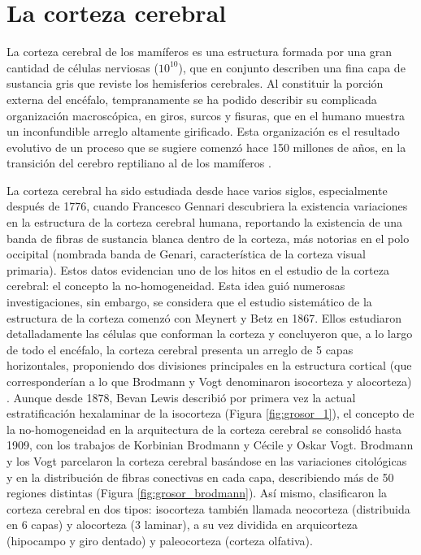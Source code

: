
\section{La corteza cerebral}
La corteza cerebral de los mamíferos es una estructura formada por una gran cantidad de células
nerviosas ($10^{10}$), que en conjunto describen una fina capa de sustancia gris que reviste los hemisferios
cerebrales. Al constituir la porción externa del encéfalo, tempranamente se ha podido describir su
complicada organización macroscópica, en giros, surcos y fisuras, que en el humano muestra un
inconfundible arreglo altamente girificado. Esta organización es el resultado evolutivo de un proceso
que se sugiere comenzó hace 150 millones de años, en la transición del cerebro reptiliano al de los
mamíferos \cite{Valverde2002}.


La corteza cerebral ha sido estudiada desde hace varios siglos, especialmente después de 1776, cuando
Francesco Gennari descubriera la existencia variaciones en la estructura de la corteza cerebral humana,
reportando la existencia de una banda de fibras de sustancia blanca dentro de la corteza, más notorias
en el polo occipital (nombrada banda de Genari, característica de la corteza visual primaria). Estos
datos evidencian uno de los hitos en el estudio de la corteza cerebral: el concepto la no-homogeneidad.
Esta idea guió numerosas investigaciones, sin embargo, se considera que el estudio sistemático de la
estructura de la corteza comenzó con Meynert y Betz en 1867. Ellos estudiaron detalladamente las células que conforman la corteza y concluyeron que, a lo largo de todo el encéfalo, la corteza cerebral presenta un arreglo de 5 capas horizontales, proponiendo dos divisiones principales en la estructura cortical (que corresponderían a lo que Brodmann y Vogt denominaron isocorteza y alocorteza) \cite{fulton_1949}. Aunque desde 1878, Bevan Lewis describió por primera vez la actual estratificación hexalaminar de la isocorteza (Figura \ref{fig:grosor_1}), el concepto de la no-homogeneidad en la arquitectura de la corteza cerebral se consolidó hasta 1909, con los trabajos de Korbinian Brodmann y Cécile y Oskar Vogt. Brodmann y los Vogt parcelaron la corteza cerebral basándose en las variaciones citológicas y en la distribución de fibras conectivas en cada capa, describiendo más de 50 regiones distintas (Figura \ref{fig:grosor_brodmann}). Así mismo, clasificaron la corteza cerebral en dos tipos: isocorteza también llamada neocorteza (distribuida en 6 capas) y alocorteza (3 laminar), a su vez dividida en arquicorteza (hipocampo y giro dentado) y paleocorteza (corteza olfativa)\cite{Valverde2002,brodal_1981}.



